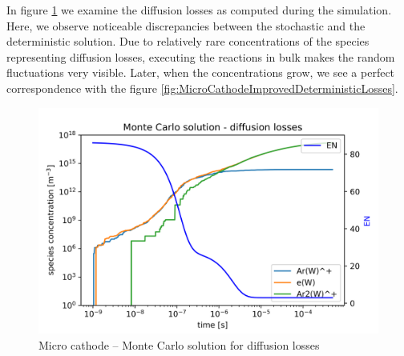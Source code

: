 In figure \ref{fig:MicroCathodeImprovedMCLosses} we examine the diffusion losses as computed during the simulation. Here, we observe noticeable discrepancies between the stochastic and the deterministic solution. Due to relatively rare concentrations of the species representing diffusion losses, executing the reactions in bulk makes the random fluctuations very visible. Later, when the concentrations grow, we see a perfect correspondence with the figure \ref{fig:MicroCathodeImprovedDeterministicLosses}.

\begin{figure} 
    \centering
    \includegraphics[width=\textwidth]{grafy/MicroCathodeImprovedMCLosses.png}
    \caption{Micro cathode -- Monte Carlo solution for diffusion losses}
    \label{fig:MicroCathodeImprovedMCLosses}
\end{figure}